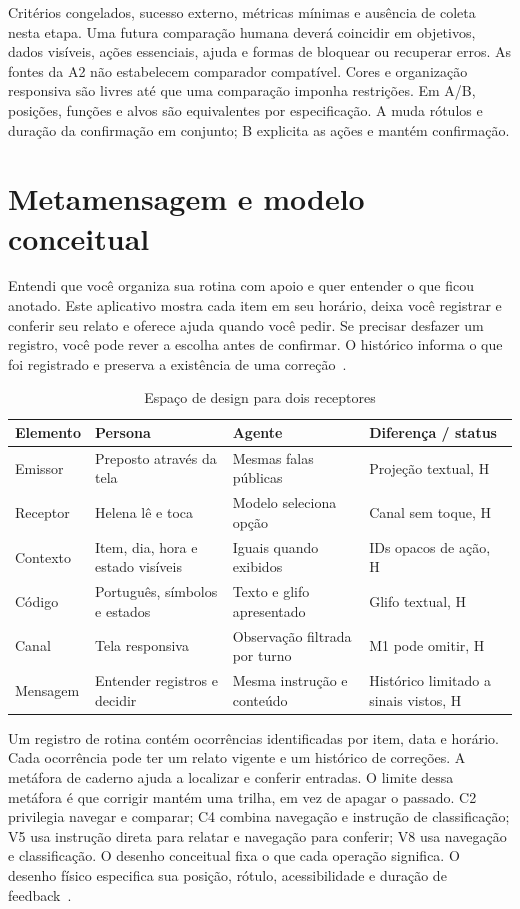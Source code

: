  Critérios congelados, sucesso externo, métricas mínimas e ausência de coleta nesta etapa. Uma futura comparação humana deverá coincidir em objetivos, dados visíveis, ações essenciais, ajuda e formas de bloquear ou recuperar erros. As fontes da A2 não estabelecem comparador compatível. Cores e organização responsiva são livres até que uma comparação imponha restrições. Em A/B, posições, funções e alvos são equivalentes por especificação. A muda rótulos e duração da confirmação em conjunto; B explicita as ações e mantém confirmação.

\section{Metamensagem e modelo conceitual}
 Entendi que você organiza sua rotina com apoio e quer entender o que ficou anotado. Este aplicativo mostra cada item em seu horário, deixa você registrar e conferir seu relato e oferece ajuda quando você pedir. Se precisar desfazer um registro, você pode rever a escolha antes de confirmar. O histórico informa o que foi registrado e preserva a existência de uma correção~\cite[cap. 7]{barbosa}.

\begin{table}[ht]
\caption{Espaço de design para dois receptores}\label{tab:receptores}
\small\begin{tabularx}{\columnwidth}{@{}P{.18\columnwidth}YYY@{}}\toprule
Elemento & Persona & Agente & Diferença / status\\\midrule
Emissor & Preposto através da tela & Mesmas falas públicas & Projeção textual, H\\
Receptor & Helena lê e toca & Modelo seleciona opção & Canal sem toque, H\\
Contexto & Item, dia, hora e estado visíveis & Iguais quando exibidos & IDs opacos de ação, H\\
Código & Português, símbolos e estados & Texto e glifo apresentado & Glifo textual, H\\
Canal & Tela responsiva & Observação filtrada por turno & M1 pode omitir, H\\
Mensagem & Entender registros e decidir & Mesma instrução e conteúdo & Histórico limitado a sinais vistos, H\\\bottomrule
\end{tabularx}
\end{table}

 Um registro de rotina contém ocorrências identificadas por item, data e horário. Cada ocorrência pode ter um relato vigente e um histórico de correções. A metáfora de caderno ajuda a localizar e conferir entradas. O limite dessa metáfora é que corrigir mantém uma trilha, em vez de apagar o passado. C2 privilegia navegar e comparar; C4 combina navegação e instrução de classificação; V5 usa instrução direta para relatar e navegação para conferir; V8 usa navegação e classificação. O desenho conceitual fixa o que cada operação significa. O desenho físico especifica sua posição, rótulo, acessibilidade e duração de feedback~\cite[p. 199]{benyon}\cite[cap. 2]{preece}.

